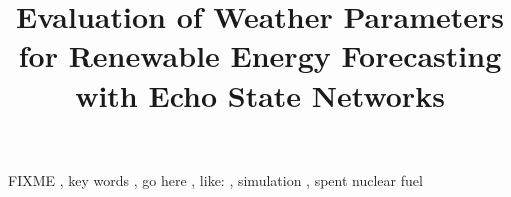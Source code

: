 \documentclass[3p, twocolumn]{elsarticle}
\begin{document}
\begin{frontmatter}
\title{Evaluation of Weather Parameters for Renewable Energy Forecasting with Echo State Networks}






\begin{keyword}
FIXME \sep
key words \sep
go here \sep
like: \sep
simulation \sep
spent nuclear fuel
\end{keyword}


\end{frontmatter}
\glsresetall

\linenumbers











%
\end{document}
